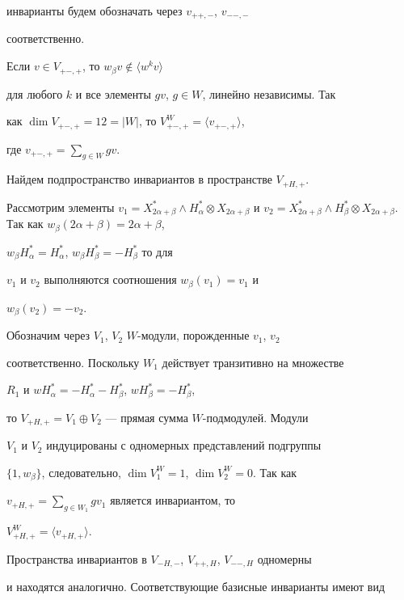 \begin{pf}
инварианты будем обозначать через $v_{++,-}$, $v_{--,-}$ 


соответственно. 


 


Если $v\in V_{+-,+}$, то $w_\beta v\notin\langle w^k v\rangle$ 


для любого $k$ и все элементы $gv$, $g\in W$, линейно независимы. Так 


как $\dim V_{+-,+}=12=|W|$, то $V^W_{+-,+}=\langle v_{+-,+}\rangle$, 


где $v_{+-,+}=\sum\limits_{g\in W}g v$. 


 


Найдем подпространство инвариантов в пространстве $V_{+H,+}$. 


Рассмотрим элементы $v_1=X^*_{2\alpha+\beta}\wedge H^*_\alpha\otimes 


X_{2\alpha+\beta}$ и $v_2=X^*_{2\alpha+\beta}\wedge H^*_\beta\otimes 


X_{2\alpha+\beta}$. Так как $w_\beta(2\alpha+\beta)=2\alpha+\beta$, 


$w_\beta H^*_\alpha=H^*_\alpha$, $w_\beta H^*_\beta=-H^*_\beta$ то для 


$v_1$ и $v_2$ выполняются соотношения $w_\beta(v_1)=v_1$ и 


$w_\beta(v_2)=-v_2$. 


Обозначим через $V_1$, $V_2$\; $W$-модули, порожденные $v_1$, $v_2$ 


соответственно. Поскольку $W_1$ действует транзитивно на множестве 


$R_1$ и $wH^*_\alpha=-H^*_\alpha-H^*_\beta$, $wH^*_\beta=-H^*_\beta$, 


то $V_{+H,+}=V_1\oplus V_2$ --- прямая сумма $W$-подмодулей. Модули 


$V_1$ и $V_2$ индуцированы с одномерных представлений подгруппы 


$\{1,w_\beta\}$, следовательно, $\dim V^W_1=1$, $\dim V^W_2=0$. Так как 


$v_{+H,+}=\sum\limits_{g\in W_1}g v_1$ является инвариантом, то 


$V^W_{+H,+}=\langle v_{+H,+}\rangle$. 


 


Пространства инвариантов в $V_{-H,-}$, $V_{++,H}$, $V_{--,H}$ одномерны 


и находятся аналогично. Соответствующие базисные инварианты имеют вид 



\end{pf}
